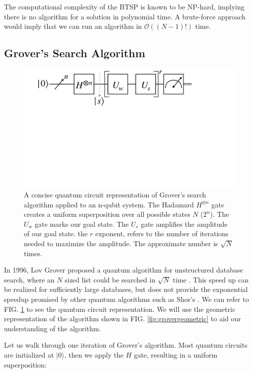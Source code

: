 \documentclass[twocolumn,showpacs,preprintnumbers,amsmath,amssymb]{revtex4}
\begin{document}
		The computational complexity of the BTSP is known to be NP-hard, implying there is no algorithm for a solution in polynomial time. A brute-force approach would imply that we can run an algorithm in $\mathcal{O}((N-1)!)$ time.
		\subsection{Grover's Search Algorithm}
		
		\begin{figure}[!h]
			\centering
			\includegraphics[trim={4.5cm 26cm 15cm 0},clip, width=0.99 \linewidth]{"graphics/grov_circ"}
			\caption{A concise quantum circuit representation of Grover's search algorithm applied to an n-qubit system. The Hadamard $H^{\otimes n }$ gate creates a uniform superposition over all possible states $N$ ($2^n$). The $U_w$ gate marks our goal state. The $U_s$ gate amplifies the amplitude of our goal state. the $r$ exponent, refers to the number of iterations needed to maximize the amplitude. The approximate number is $\sqrt{N}$ times.}
			\label{fig:grovercircuit}
		\end{figure}
		
		In 1996, Lov Grover proposed a quantum algorithm for unstructured database search, where an $N$ sized list could be searched in $\sqrt{N}$ time \cite{grover1996fast}. This speed up can be realized for sufficiently large databases, but does not provide the exponential speedup promised by other quantum algorithms such as Shor's \cite{Shor}. We can refer to FIG. \ref{fig:grovercircuit} to see the quantum circuit representation. We will use the geometric representation of the algorithm shown in FIG. \ref{fig:grovergeometric} to aid our understanding of the algorithm.  
		
		Let us walk through one iteration of Grover's algorithm. Most quantum circuits are initialized at $|0\rangle$, then we apply the $H$ gate, resulting in a uniform superposition:
\end{document}
